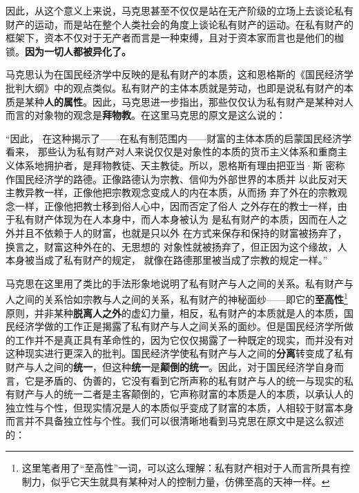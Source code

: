 \documentclass[a4paper,twoside,12pt,AutoFakeBold]{ctexart}
\begin{document}
因此，从这个意义上来说，马克思甚至不仅仅是站在无产阶级的立场上去谈论私有财产的运动，而是站在整个人类社会的角度上谈论私有财产的运动。在私有财产的框架下，资本不仅对于无产者而言是一种束缚，且对于资本家而言也是他们的枷锁。\textbf{因为一切人都被异化了。}

马克思认为在国民经济学中反映的是私有财产的本质，这和恩格斯的《国民经济学批判大纲》中的观点类似。私有财产的主体本质就是劳动，也即是说私有财产的本质是某种\textbf{人的属性}。因此，马克思进一步指出，那些仅仅认为私有财产是某种对人而言的对象物的观念是\textbf{拜物教}。在这里马克思的原文是这么说的：

\begin{fangsong}
“因此，
在这种揭示了——在私有制范围内——财富的主体本质的启蒙国民经济学看来，
那些认为私有财产对人来说仅仅是对象性的本质的货币主义体系和重商主
义体系地拥护者，是拜物教徒、天主教徒。所以，恩格斯有理由把亚当·斯
密称作国民经济学的路德。正像路德认为宗教、信仰为外部世界的本质并
以此反对天主教异教一样，正像他把宗教观念变成人的内在本质，从而扬
弃了外在的宗教观念一样，正像他把教士移到俗人心中，因而否定了俗人
之外存在的教士一样，由于私有财产体现为在人本身中，而人本身被认为
是私有财产的本质，因而在人之外并且不依赖于人的财富，也就是只以外
在方式来保存和保持的财富被扬弃了，换言之，财富这种外在的、无思想的
对象性就被扬弃了，但正因为这个缘故，人本身被当成了私有财产的规定，
就像在路德那里被当成了宗教的规定一样。”
\end{fangsong}

马克思在这里用了类比的手法形象地说明了私有财产与人之间的关系。私有财产与人之间的关系恰如宗教与人之间的关系，私有财产的神秘面纱——即它的\textbf{至高性}\footnote{这里笔者用了“至高性”一词，可以这么理解：私有财产相对于人而言所具有控制力，似乎它天生就具有某种对人的控制力量，仿佛至高的天神一样。}原则，并非某种\textbf{脱离人之外}的虚幻力量，相反，私有财产的本质就是人的本质，国民经济学做的工作正是揭露了私有财产与人之间关系的面纱。但是国民经济学所做的工作并不是真正具有革命性的，因为它仅仅揭露了一种既定的现实，而并没有对这种现实进行更深入的批判。国民经济学使私有财产与人之间的\textbf{分离}转变成了私有财产与人之间的\textbf{统一}，但这种\textbf{统一}是\textbf{颠倒的统一}。因此，对于国民经济学自身而言，它是矛盾的、伪善的，它没有看到它所声称的私有财产与人的统一与现实的私有财产与人的统一二者是主客颠倒的，它声称财富的本质是人的本质，以承认人的独立性与个性，但现实情况是人的本质似乎变成了财富的本质，人相较于财富本身而言并不具备独立性与个性。我们可以很清晰地看到马克思在原文中是这么叙述的：
\end{document}
